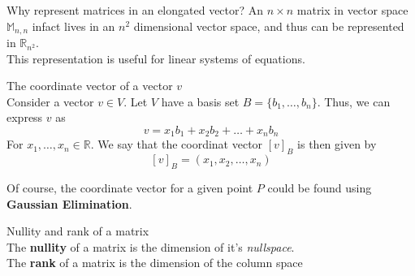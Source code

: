 \documentclass[journal, letterpaper]{IEEEtran}
\begin{document}
    \begin{myboxr}{Why represent matrices in an elongated vector?}
        An $n \times n$ matrix in vector space $\mathbb{M}_{n, n}$ infact lives in an 
        $n^2$ dimensional vector space, and thus can be represented in $\mathbb{R}_{n^2}$.
        \newline \\ 
        This representation is useful for linear systems of equations.
    \end{myboxr}
    \begin{mybox}{The coordinate vector of a vector $v$} \\ 
        Consider a vector $v \in V$. Let $V$ have a basis set $B = \{b_1, \dots, b_n\}$. Thus, we can express 
        $v$ as
        $$ v = x_1b_1 + x_2b_2 + \dots + x_nb_n$$
        For $x_1, \dots, x_n \in \mathbb{R}$. We say that the coordinat vector $[v]_B$ is then given by
        $$ [v]_B = (x_1, x_2, \dots, x_n)$$
    \end{mybox}
    Of course, the coordinate vector for a given point $P$ could be found using \textbf{Gaussian Elimination}.
    \begin{mybox}{Nullity and rank of a matrix} \\ 
        The \textbf{nullity} of a matrix is the dimension of it's \textit{nullspace}.
        \newline \\ 
        The \textbf{rank} of a matrix is the dimension of the column space
    \end{mybox}
\end{document}
